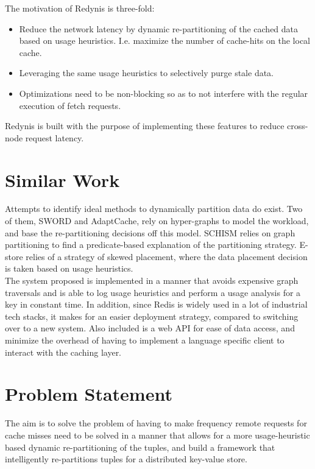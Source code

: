 \documentclass{sig-alternate}
\begin{document}
The motivation of Redynis is three-fold:
\begin{itemize}
	\item Reduce the network latency by dynamic re-partitioning of the cached data based on usage heuristics. I.e. maximize the number of cache-hits on the local cache.
	\item Leveraging the same usage heuristics to selectively purge stale data.
	\item Optimizations need to be non-blocking so as to not interfere with the regular execution of fetch requests.
\end{itemize}

Redynis is built with the purpose of implementing these features to reduce cross-node request latency.

\section{Similar Work}
Attempts to identify ideal methods to dynamically partition data do exist. Two of them, SWORD\cite{quamar2013sword} and AdaptCache\cite{asad2016adaptcache}, rely on hyper-graphs to model the workload, and base the re-partitioning decisions off this model. SCHISM\cite{curino2010schism} relies on graph partitioning to find a predicate-based explanation of the partitioning strategy. E-store\cite{taft2014store} relies of a strategy of skewed placement, where the data placement decision is taken based on usage heuristics.\\

The system proposed is implemented in a manner that avoids expensive graph traversals and is able to log usage heuristics and perform a usage analysis for a key in constant time. In addition, since Redis is widely used in a lot of industrial tech stacks\cite{redis-popularity}, it makes for an easier deployment strategy, compared to switching over to a new system. Also included is a web API for ease of data access, and minimize the overhead of having to implement a language specific client to interact with the caching layer.\\

\section{Problem Statement}
The aim is to solve the problem of having to make frequency remote requests for cache misses need to be solved in a manner that allows for a more usage-heuristic based dynamic re-partitioning of the tuples, and build a framework that intelligently re-partitions tuples for a distributed key-value store.\\
\end{document}
